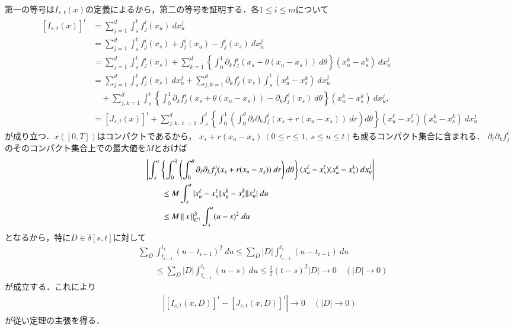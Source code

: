 	\begin{prf}
		第一の等号は$I_{s,t}(x)$の定義によるから，第二の等号を証明する．各$1 \leq i \leq m$について
		\begin{align}
			\left[ I_{s,t}(x) \right]^i
			&= \sum_{j=1}^d \int_s^t f_j^i(x_u)\ dx^j_u \\
			&= \sum_{j=1}^d \int_s^t f_j^i(x_s) + f_j^i(x_u) - f_j^i(x_s)\ dx^j_u \\
			&= \sum_{j=1}^d \int_s^t f_j^i(x_s) 
				+ \sum_{k=1}^d  \left\{ \int_0^1 \partial_k f_j^i(x_s + \theta(x_u - x_s))\ d\theta \right\} (x^k_u - x^k_s)\ dx^j_u \\
			&= \sum_{j=1}^d \int_s^t f_j^i(x_s)\ dx^j_u + \sum_{j,k=1}^d \partial_k f_j^i(x_s) \int_s^t (x^k_u - x^k_s)\ dx^j_u \\
				&\quad + \sum_{j,k=1}^d \int_s^t 
				\left\{ \int_0^1 \partial_k f_j^i(x_s + \theta(x_u - x_s)) - \partial_k f_j^i(x_s)\ d\theta \right\} (x^k_u - x^k_s)\ dx^j_u, \\
			&= \left[ J_{s,t}(x) \right]^i
				+ \sum_{j,k,\ell=1}^d \int_s^t 
				\left\{ \int_0^1 \left( \int_0^\theta \partial_\ell \partial_k f_j^i(x_s + r(x_u - x_s))\ dr\right) d\theta \right\} (x^\ell_u - x^\ell_s)(x^k_u - x^k_s)\ dx^j_u
		\end{align}
		が成り立つ．$x([0,T])$はコンパクトであるから，
		$x_s + r(x_u - x_s)\ (0 \leq r \leq 1,\ s \leq u \leq t)$も或るコンパクト集合に含まれる．
		$\partial_\ell \partial_k f_j^i$のそのコンパクト集合上での最大値を$M$とおけば
		\begin{align}
			&\left| \int_s^t 
				\left\{ \int_0^1 \left( \int_0^\theta \partial_\ell \partial_k f_j^i(x_s + r(x_u - x_s))\ dr\right) d\theta \right\} (x^\ell_u - x^\ell_s)(x^k_u - x^k_s)\ dx^j_u \right| \\
			&\qquad \leq M \int_s^t |x^\ell_u - x^\ell_s||x^k_u - x^k_s| |\dot{x}^j_u|\ du \\
			&\qquad \leq M \left\|\, x\, \right\|_{C^1}^3 \int_s^t (u - s)^2\ du
		\end{align}
		となるから，特に$D \in \delta[s,t]$に対して
		\begin{align}
			&\sum_D \int_{t_{i-1}}^{t_i} (u - t_{i-1})^2\ du
			\leq \sum_D |D| \int_{t_{i-1}}^{t_i} (u - t_{i-1})\ du \\
			&\qquad \leq \sum_D |D| \int_{t_{i-1}}^{t_i} (u - s)\ du
			\leq \frac{1}{2}(t-s)^2 |D|
			\longrightarrow 0 \quad (|D| \longrightarrow 0)
		\end{align}
		が成立する．これにより
		\begin{align}
			\left| \left[ I_{s,t}(x,D) \right]^i - \left[ J_{s,t}(x,D) \right]^i \right| \longrightarrow 0 \quad (|D| \longrightarrow 0)
		\end{align}
		が従い定理の主張を得る．
		\QED
	\end{prf}
	

